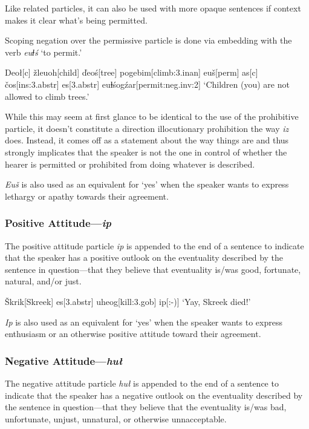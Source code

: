 \documentclass[a4paper,11pt,oneside,openany]{memoir}
\newcommand{\vd}{ď}
\newcommand{\vc}{č}
\newcommand{\vz}{ž}
\newcommand{\vs}{š}
\newcommand{\vS}{Š}
\newcommand{\dbl}{ⱡ}
\begin{document}
Like related particles, it can also be used with more opaque sentences if context makes it clear what's being permitted. 

Scoping negation over the permissive particle is done via embedding with the verb \textit{eu\dbl\'s} `to permit.'

\ex 
\begingl
Deo\l[\sc c]
\vz leuoh[child]
\vd eo\'s[tree]
pogebim[climb:{\sc 3.inan}]
eu\vs[\sc perm]
\nogloss{,}
as[\sc c]
\vc os[\sc ins:3.abstr]
es[\sc 3.abstr]
eu\dbl\'sog\'zar[permit:{\sc neg.inv:2}]
\glft `Children (you) are not allowed to climb trees.'
\endgl
\xe

While this may seem at first glance to be identical to the use of the prohibitive particle, it doesn't constitute a direction illocutionary prohibition the way \textit{iz} does. Instead, it comes off as a statement about the way things are and thus strongly implicates that the speaker is not the one in control of whether the hearer is permitted or prohibited from doing whatever is described.

\textit{Eu\vs} is also used as an equivalent for `yes' when the speaker wants to express lethargy or apathy towards their agreement.

\subsubsection{Positive Attitude---\textit{ip}}

The positive attitude particle \textit{ip} is appended to the end of a sentence to indicate that the speaker has a positive outlook on the eventuality described by the sentence in question---that they believe that eventuality is/was good, fortunate, natural, and/or just.

\ex
\begingl
\vS krik[Skreek]
es[\sc 3.abstr]
uheog[kill:{\sc 3.gob}]
ip[:-{)}]
\glft `Yay, Skreek died!'
\endgl
\xe

\textit{Ip} is also used as an equivalent for `yes' when the speaker wants to express enthusiasm or an otherwise positive attitude toward their agreement.

\subsubsection{Negative Attitude---\textit{hu\l}}

The negative attitude particle \textit{hu\l} is appended to the end of a sentence to indicate that the speaker has a negative outlook on the eventuality described by the sentence in question---that they believe that the eventuality is/was bad, unfortunate, unjust, unnatural, or otherwise unnacceptable.
\end{document}
